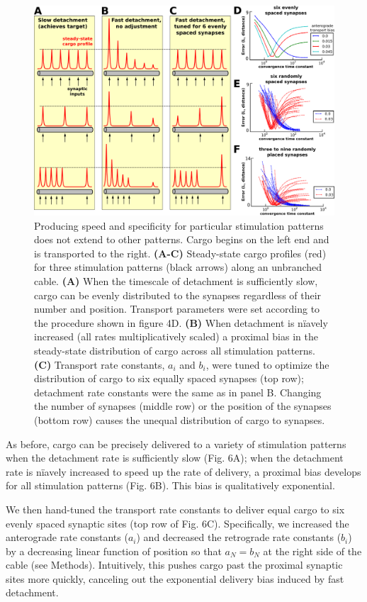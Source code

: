 \documentclass[11pt]{wlpeerj}
\begin{document}
\begin{figure}[!tb]
\begin{center}
\includegraphics[width=0.9\columnwidth]{06_heterosynaptic_cable.png}
\caption{Producing speed and specificity for particular stimulation patterns does not extend to other patterns. Cargo begins on the left end and is transported to the right.
\textbf{(A-C)} Steady-state cargo profiles (red) for three stimulation patterns (black arrows) along an unbranched cable.
\textbf{(A)} When the timescale of detachment is sufficiently slow, cargo can be evenly distributed to the synapses regardless of their number and position. Transport parameters were set according to the procedure shown in figure 4D.
\textbf{(B)} When detachment is n\"iavely increased (all rates multiplicatively scaled) a proximal bias in the steady-state distribution of cargo across all stimulation patterns.
\textbf{(C)} Transport rate constants, $a_i$ and $b_i$, were tuned to optimize the distribution of cargo to six equally spaced synapses (top row); detachment rate constants were the same as in panel B. Changing the number of synapses (middle row) or the position of the synapses (bottom row) causes the unequal distribution of cargo to synapses.
}
\end{center}
\end{figure}

As before, cargo can be precisely delivered to a variety of stimulation patterns when the detachment rate is sufficiently slow (Fig. 6A); when the detachment rate is n\"iavely increased to speed up the rate of delivery, a proximal bias develops for all stimulation patterns (Fig. 6B).
This bias is qualitatively exponential.

We then hand-tuned the transport rate constants to deliver equal cargo to six evenly spaced synaptic sites (top row of Fig. 6C).
Specifically, we increased the anterograde rate constants ($a_i$) and decreased the retrograde rate constants ($b_i$) by a decreasing linear function of position so that $a_N = b_N$ at the right side of the cable (see Methods).
Intuitively, this pushes cargo past the proximal synaptic sites more quickly, canceling out the exponential delivery bias induced by fast detachment.
\end{document}
